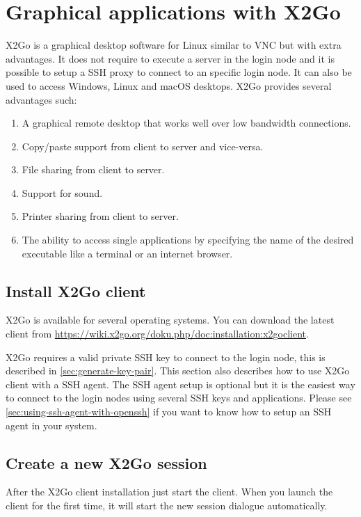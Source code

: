 \chapter{Graphical applications with X2Go}
\label{ch:x2go}

X2Go is a graphical desktop software for Linux similar to VNC but with extra advantages.
It does not require to execute a server in the login node and it is possible to setup a SSH proxy to
connect to an specific login node.
It can also be used to access Windows, Linux and macOS desktops.
X2Go provides several advantages such:
\begin{enumerate}
 \item A graphical remote desktop that works well over low bandwidth connections.
 \item Copy/paste support from client to server and vice-versa.
 \item File sharing from client to server.
 \item Support for sound.
 \item Printer sharing from client to server.
 \item The ability to access single applications by specifying the name of the desired executable like a terminal
 or an internet browser.
\end{enumerate}



\section{Install X2Go client}
\label{sec:x2go-client}
X2Go is available for several operating systems. You can download the latest client from 
\url{https://wiki.x2go.org/doku.php/doc:installation:x2goclient}.

X2Go requires a valid private SSH key to connect to the login node, this is described in \autoref{sec:generate-key-pair}.
This section also describes how to use X2Go client with a SSH agent. The SSH agent setup is optional but it 
is the easiest way to connect to the login nodes using several SSH keys and applications.
Please see \autoref{sec:using-ssh-agent-with-openssh} if you want to know how to setup an SSH agent in your system.


\section{Create a new X2Go session}
\label{sec:sessions-x2go}

After the X2Go client installation just start the client.
When you launch the client for the first time, it will start the new session dialogue automatically.

